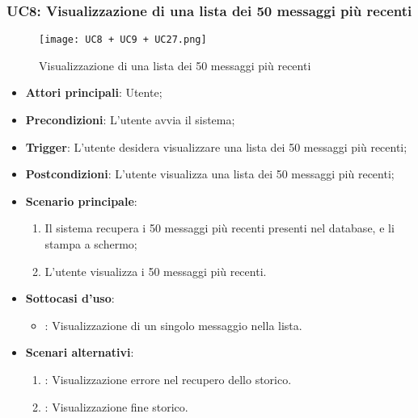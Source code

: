 \hypertarget{UC8}{}
\subsubsection{UC8: Visualizzazione di una lista dei 50 messaggi più recenti}

\begin{figure}[h]
    \centering
    \texttt{[image: UC8 + UC9 + UC27.png]}
    \caption{Visualizzazione di una lista dei 50 messaggi più recenti}
\end{figure}

\begin{itemize}
    \item \textbf{Attori principali}: Utente;
    \item \textbf{Precondizioni}: L'utente avvia il sistema;
    \item \textbf{Trigger}: L'utente desidera visualizzare una lista dei 50 messaggi più recenti;
    \item \textbf{Postcondizioni}: L'utente visualizza una lista dei 50 messaggi più recenti;
    \item \textbf{Scenario principale}:
    \begin{enumerate}
        \item Il sistema recupera i 50 messaggi più recenti presenti nel database, e li stampa a schermo;
        \item L'utente visualizza i 50 messaggi più recenti.
    \end{enumerate}
    \item \textbf{Sottocasi d'uso}:
    \begin{itemize}
        \item {}: Visualizzazione di un singolo messaggio nella lista.
    \end{itemize}
    \item \textbf{Scenari alternativi}:
    \begin{enumerate}
        \item {}: Visualizzazione errore nel recupero dello storico.
        \item {}: Visualizzazione fine storico.
    \end{enumerate}
\end{itemize}

\hypertarget{UC8.1}{}
